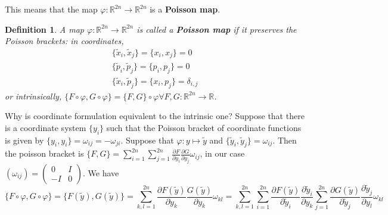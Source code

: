 \documentclass[a4paper, 11pt]{article}
\newtheorem{definition}[theorem]{Definition}
\begin{document}
This means that the map $\varphi: \mathbb R^{2n} \to \mathbb R^{2n}$ is a \textbf{Poisson map}. 
\begin{definition}
	A map $\varphi: \mathbb R^{2n} \to \mathbb R^{2n}$ is called a \textbf{Poisson map} if it preserves the Poisson brackets: in coordinates, 
	\begin{align*}
		\{\tilde x_i, \tilde  x_j \} = \{ x_i,x_j \} = 0 \\
		\{\tilde p_i, \tilde  p_j \} = \{ p_i,p_j \} = 0 \\
		\{\tilde x_i, \tilde  p_j \} = \{ x_i,p_j \} = \delta_{i,j}
	\end{align*}
	or intrinsically, $\{ F \circ \varphi, G \circ \varphi \} = \{ F,G \} \circ \varphi \forall F,G: \mathbb R^{2n} \to \mathbb R$. 
\end{definition}
 
 Why is coordinate formulation equivalent to the intrinsic one? Suppose that there is a coordinate system $\{y_i\}$  such that the Poisson bracket of coordinate functions is given by $\{ y_i,y_i \} = \omega_{ij} = -\omega_{ji}$. Suppose that $\varphi: y \mapsto \tilde y$ and $\{ \tilde y_i, \tilde y_j \} = \omega_{ij}$. Then the poisson bracket is $\{F,G\}  = \sum^{2n}_{i=1} \sum^{2n}_{j=1} \frac{\partial F}{\partial y_i}  \frac{\partial G}{\partial y_j} \omega_{ij}$, in our case $(\omega_{ij}) = \begin{pmatrix}
 0 & I \\ -I & 0
 \end{pmatrix}$. We have
 \[
 	\{ F \circ \varphi, G \circ \varphi \} = \{ F(\tilde y), G(\tilde y) \} = \sum^{2n}_{k,l = 1} \frac{\partial F(\tilde y)}{\partial y_k} \frac{G(\tilde y)}{\partial y_k} \omega_{kl} = \sum^{2n}_{k,l=1} \sum^{2n}_{i=1} \frac{\partial F(\tilde y)}{\partial \tilde y_i} \frac{\partial \tilde y_i}{\partial y_k} \sum^{2n}_{j=1} \frac{\partial G(\tilde y)}{\partial \tilde y_j} \frac{\partial \tilde y_j}{\partial y_l}\omega_{kl}
  \]
 
\end{document}
